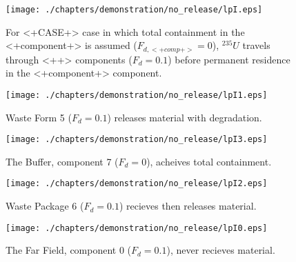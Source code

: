 
\begin{figure}[ht]
\centering
\texttt{[image: ./chapters/demonstration/no\_release/lpI.eps]}
\caption[$^{235}U$ residence. Lumped Parameter  <+Component+> No Release.]{
For <+CASE+> case in which total containment in the <+component+> is assumed 
($F_{d,<+comp+>}=0$), $^{235}U$ travels through <++> components ($F_d = 0.1$) before 
permanent residence in the <+component+> component.
}
\label{fig:lpIall}
\begin{minipage}[b]{0.45\linewidth}

  \texttt{[image: ./chapters/demonstration/no\_release/lpI1.eps]}
  \caption[1DI Waste Form Contaminants.]{
    Waste Form 5 ($F_d = 0.1$) releases material with degradation. 
    }
  \label{fig:lpIwf5}
  
  \texttt{[image: ./chapters/demonstration/no\_release/lpI3.eps]}
  \caption[Case 1DI Buffer Contaminants]{
    The Buffer, component 7 ($F_d=0$), acheives total containment.
    }
  \label{fig:lpIbuff}

\end{minipage}
\hspace{0.05\linewidth}
\begin{minipage}[b]{0.45\linewidth}
  \texttt{[image: ./chapters/demonstration/no\_release/lpI2.eps]}
  \caption[Case 1DI Waste Package Contaminants.]{ 
    Waste Package 6 ($F_d = 0.1$) recieves then releases material. 
    }
  \label{fig:lpIwp6}

  \texttt{[image: ./chapters/demonstration/no\_release/lpI0.eps]}
  \caption[Case 1DI Waste Package Contaminants.]{ 
    The Far Field, component 0 ($F_d = 0.1$), never recieves material.
    }
  \label{fig:lpIff0}


  \end{minipage}
\end{figure}
